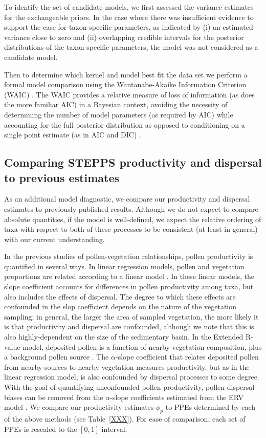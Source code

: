 \documentclass[12pt]{article}
\begin{document}
To identify the set of candidate models, we first assessed the
variance estimates for the exchangeable priors. In the case where
there was insufficient evidence to support the case for taxon-specific
parameters, as indicated by (i) an estimated variance close to zero
and (ii) overlapping credible intervals for the posterior
distributions of the taxon-specific parameters, the model was not
considered as a candidate model.

Then to determine which kernel and model best fit the data set we
perform a formal model comparison using the Wantanabe-Akaike
Information Criterion (WAIC) \citep{watanabe2010asymptotic}. The WAIC
provides a relative measure of loss of information (as does the more
familiar AIC) in a Bayesian context, avoiding the necessity of
determining the number of model parameters (as required by AIC) while
accounting for the full posterior distribution as opposed to
conditioning on a single point estimate (as in AIC and DIC)
\citep{gelman2014understanding}.

\subsection{Comparing STEPPS productivity and dispersal to
  previous estimates}

As an additional model diagnostic, we compare our productivity and
dispersal estimates to previously published results. Although we do
not expect to compare absolute quantities, if the model is
well-defined, we expect the relative ordering of taxa with respect to
both of these processes to be consistent (at least in general) with
our current understanding.

In the previous studies of pollen-vegetation relationships, pollen
productivity is quantified in several ways. In linear regression
models, pollen and vegetation proportions are related according to a
linear model \citep{XXX}. In these linear models, the slope
coefficient accounts for differences in pollen productivity among
taxa, but also includes the effects of dispersal. The degree to which
these effects are confounded in the slop coefficient depends on the
nature of the vegetation sampling; in general, the larger the area of
sampled vegetation, the more likely it is that productivity and
dispersal are confounded, although we note that this is also
highly-dependent on the size of the sedimentary basin. In the Extended
R-value model, deposited pollen is a function of nearby vegetation
composition, plus a background pollen source \citep{XXX}. The
$\alpha$-slope coefficient that relates deposited pollen from nearby
sources to nearby vegetation measures productivity, but as in the
linear regression model, is also confounded by dispersal processes to
some degree. With the goal of quantifying unconfounded pollen
productivity, pollen dispersal biases can be removed from the
$\alpha$-slope coefficients estimated from the ERV model
\citep{XXX}. We compare our productivity estimates $\phi_p$ to PPEs
determined by each of the above methods (see Table~\ref{XXX}). For
ease of comparison, each set of PPEs is rescaled to the $[0,1]$
interval.
\end{document}
